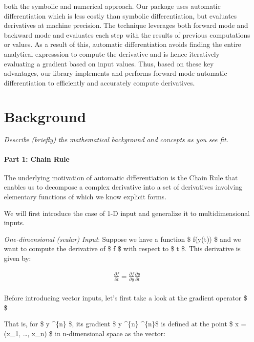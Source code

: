 \documentclass[11pt]{article}
\begin{document}
\begin{itemize}
  both the symbolic and numerical approach. Our package uses automatic
  differentiation which is less costly than symbolic differentiation,
  but evaluates derivatives at machine precision. The technique
  leverages both forward mode and backward mode and evaluates each step
  with the results of previous computations or values. As a result of
  this, automatic differentiation avoids finding the entire analytical
  expresssion to compute the derivative and is hence iteratively
  evaluating a gradient based on input values. Thus, based on these key
  advantages, our library implements and performs forward mode automatic
  differentiation to efficiently and accurately compute derivatives.
\end{itemize}

    \hypertarget{background}{%
\section{Background}\label{background}}

    \emph{Describe (briefly) the mathematical background and concepts as you
see fit.}

\hypertarget{part-1-chain-rule}{%
\paragraph{Part 1: Chain Rule}\label{part-1-chain-rule}}

The underlying motivation of automatic differentiation is the Chain Rule
that enables us to decompose a complex derivative into a set of
derivatives involving elementary functions of which we know explicit
forms.

We will first introduce the case of 1-D input and generalize it to
multidimensional inputs.

\emph{One-dimensional (scalar) Input}: Suppose we have a function \$
f(y(t)) \$ and we want to compute the derivative of \$ f \$ with respect
to \$ t \$. This derivative is given by:

\[
\begin{align}
\frac{\partial f}{\partial t} = \frac{\partial f}{\partial y} \frac{\partial y}{\partial t}\\
\end{align}
\]

Before introducing vector inputs, let's first take a look at the
gradient operator \$ \nabla \$

That is, for \$ y\colon {} \^{}\{n\} \to {} \$, its
gradient \$ \nabla y \colon {} \^{}\{n\} \to {}
\^{}\{n\}\$ is defined at the point \$ x = (x\_1, \ldots{}, x\_n) \$ in
n-dimensional space as the vector:
\end{document}
